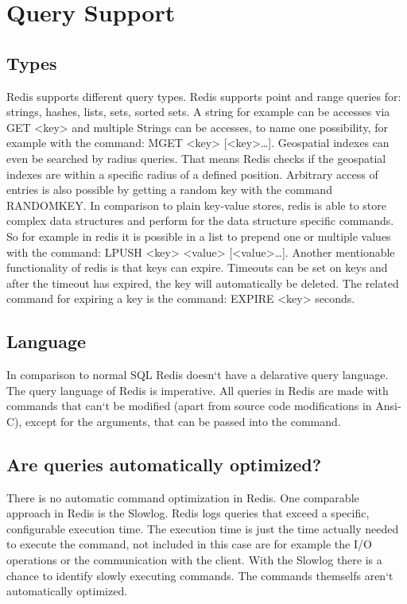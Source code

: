 \chapter{Query Support}

\section{Types}
Redis supports different query types. Redis supports point and range queries for:
strings, hashes, lists, sets, sorted sets. A string for example can be accesses via GET <key> and multiple Strings can be accesses, to name one possibility, for example with the command: MGET <key> [<key>…]. Geospatial indexes can even be searched by radius queries. That means Redis checks if the geospatial indexes are within a specific radius of a defined
position. Arbitrary access of entries is also possible by getting a random key with the command RANDOMKEY. In comparison to plain key-value stores, redis is able to store complex data structures and perform for the data structure specific commands. So for example in redis it is possible in a list to prepend one or multiple values with the command: LPUSH <key> <value> [<value>…]. Another mentionable functionality of redis is that keys can expire. Timeouts can be set on keys and after the timeout has expired, the key will automatically be deleted. The related command for expiring a key is the command: EXPIRE <key> {seconds}.

\section{Language}
In comparison to normal SQL Redis doesn‘t have a delarative query language. The query language of Redis is imperative. All queries in Redis are made with commands that can‘t be modified (apart from source code modifications in Ansi-C), except for the arguments, that can be passed into the command.

\section{Are queries automatically optimized?}
There is no automatic command optimization in Redis. One comparable approach in Redis is the Slowlog. Redis logs queries that exceed a specific, configurable execution time. The execution time is just the time actually needed to execute the command, not included in this case are for example the I/O operations or the communication with the client. With the Slowlog there is a chance to identify slowly executing commands. The commands themselfs aren‘t automatically optimized.
